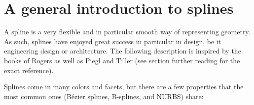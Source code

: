 \documentclass[11pt,a4paper]{article}
\begin{document}


\section{A general introduction to splines}

A spline is a very flexible and in particular smooth way of representing geometry. As such, splines have enjoyed great success in particular in design, be it engineering design or architecture. The following description is inspired by the books of Rogers as well as Piegl and Tiller (see section further reading for the exact reference). 

Splines come in many colors and facets, but there are a few properties that the most common ones (Bézier splines, B-splines, and NURBS) share:
\end{document}
